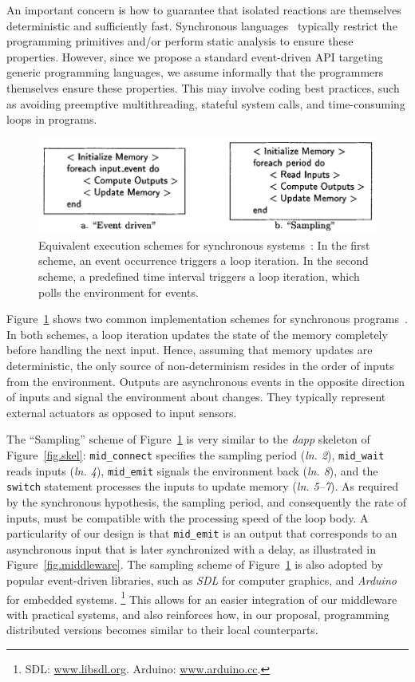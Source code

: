 \documentclass[sigplan,screen]{acmart}
\newcommand{\lin}[1]{(\emph{ln. #1}\xspace)}
\newcommand{\dapp}{\emph{dapp}\xspace}
\begin{document}
An important concern is how to guarantee that isolated reactions are themselves
deterministic and sufficiently fast.
Synchronous languages~\cite{langs} typically restrict the programming
primitives and/or perform static analysis to ensure these properties.
However, since we propose a standard event-driven API targeting generic
programming languages, we assume informally that the programmers themselves
ensure these properties.
This may involve coding best practices, such as avoiding preemptive
multithreading, stateful system calls, and time-consuming loops in programs.

\begin{figure}[t]
  \centering
  \includegraphics[width=\linewidth]{schemes}
  \caption{
    \label{fig.schemes}
    Equivalent execution schemes for synchronous systems~\cite{schemes}:
    In the first scheme, an event occurrence triggers a loop iteration.
    In the second scheme, a predefined time interval triggers a loop iteration,
    which polls the environment for events.
  }
\end{figure}

Figure~\ref{fig.schemes} shows two common implementation schemes for
synchronous programs~\cite{schemes}.
In both schemes, a loop iteration updates the state of the memory completely
before handling the next input.
Hence, assuming that memory updates are deterministic, the only source of
non-determinism resides in the order of inputs from the environment.
Outputs are asynchronous events in the opposite direction of inputs and
signal the environment about changes.
They typically represent external actuators as opposed to input sensors.

The ``Sampling'' scheme of Figure~\ref{fig.schemes} is very similar to the
\dapp skeleton of Figure~\ref{fig.skel}:
    \texttt{mid\_connect} specifies the sampling period \lin{2},
    \texttt{mid\_wait} reads inputs \lin{4},
    \texttt{mid\_emit} signals the environment back \lin{8}, and
    the \texttt{switch} statement processes the inputs to update memory \lin{5--7}.
As required by the synchronous hypothesis, the sampling period, and
consequently the rate of inputs, must be compatible with the processing speed
of the loop body.
A particularity of our design is that \texttt{mid\_emit} is an output that
corresponds to an asynchronous input that is later synchronized with a delay,
as illustrated in Figure~\ref{fig.middleware}.
%
The sampling scheme of Figure~\ref{fig.schemes} is also adopted by popular
event-driven libraries, such as \emph{SDL} for computer graphics, and
\emph{Arduino} for embedded systems.%
\footnote{SDL: \url{www.libsdl.org}. Arduino: \url{www.arduino.cc}.}
This allows for an easier integration of our middleware with practical systems,
and also reinforces how, in our proposal, programming distributed versions
becomes similar to their local counterparts.
\end{document}
